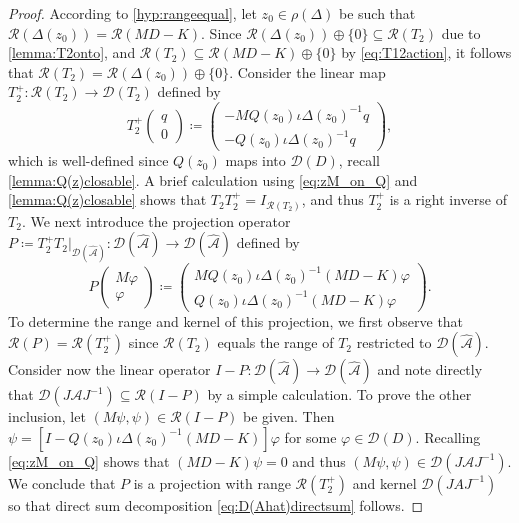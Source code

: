 \documentclass[10pt,a4paper]{amsart}
\begin{document}
\begin{proof}
According to \ref{hyp:rangeequal}, let $z_0\in \rho(\Delta)$ be such that $\mathcal{R}(\Delta(z_0)) = \mathcal{R}(MD - K)$. Since $\mathcal{R}(\Delta(z_0)) \oplus \{0 \} \subseteq \mathcal{R}(T_2)$ due to \cref{lemma:T2onto}, and
$\mathcal{R}(T_2) \subseteq \mathcal{R}(MD - K) \oplus \{0 \}$ by \eqref{eq:T12action}, it follows that $\mathcal{R}(T_2) = \mathcal{R}(\Delta(z_0)) \oplus \{0\}$. Consider the linear map $T_2^+ : \mathcal{R}(T_2) \to \mathcal{D}(T_2)$ defined by
\begin{equation*}
    T_2^{+}
    \begin{pmatrix}
        q \\
        0
    \end{pmatrix}
    \coloneqq
    \begin{pmatrix}
        -MQ(z_0)\iota\Delta(z_0)^{-1}q \\
        -Q(z_0)\iota\Delta(z_0)^{-1}q
    \end{pmatrix},
\end{equation*}
which is well-defined since $Q(z_0)$ maps into $\mathcal{D}(D)$, recall \cref{lemma:Q(z)closable}. 
A brief calculation using \eqref{eq:zM_on_Q} and \cref{lemma:Q(z)closable} shows that $T_2 T_2^{+} = I_{\mathcal{R}(T_2)}$, and thus $T_2^+$ is a right inverse of $T_2$. We next introduce the projection operator $P \coloneqq T_2^{+}T_2 |_{\mathcal{D}(\hat{\mathcal{A}})} : \mathcal{D}(\hat{\mathcal{A}}) \to \mathcal{D}(\hat{\mathcal{A}})$ defined by
\begin{equation} \label{eq:projectionP}
    P
    \begin{pmatrix}
        M\varphi \\
        \varphi
    \end{pmatrix}
    \coloneqq
    \begin{pmatrix}
        MQ(z_0)\iota\Delta(z_0)^{-1}(MD-K)\varphi \\
        Q(z_0)\iota\Delta(z_0)^{-1}(MD-K)\varphi
    \end{pmatrix}. 
\end{equation}
To determine the range and kernel of this projection, we first observe that $\mathcal{R}(P) = \mathcal{R}(T_2^+)$ since $\mathcal{R}(T_{2})$ equals the range of $T_2$ restricted to $\mathcal{D}(\hat{\mathcal{A}})$. Consider now the linear operator $I-P : \mathcal{D}(\hat{\mathcal{A}}) \to \mathcal{D}(\hat{\mathcal{A}})$ and note directly that $\mathcal{D}(J\mathcal{A}J^{-1}) \subseteq \mathcal{R}(I-P)$ by a simple calculation. To prove the other inclusion, let $(M\psi,\psi) \in \mathcal{R}(I-P)$ be given. Then $\psi = [I - Q(z_0)\iota \Delta(z_0)^{-1} (MD-K)] \varphi$ for some $\varphi \in \mathcal{D}(D)$. Recalling \eqref{eq:zM_on_Q} shows that $(MD-K)\psi = 0$ and thus $(M \psi,\psi) \in \mathcal{D}(J\mathcal{A}J^{-1})$. We conclude that $P$ is a projection with range $\mathcal{R}(T_2^+)$ and kernel $\mathcal{D}(JAJ^{-1})$ so that direct sum decomposition \eqref{eq:D(Ahat)directsum} follows.
\end{proof}
\end{document}
